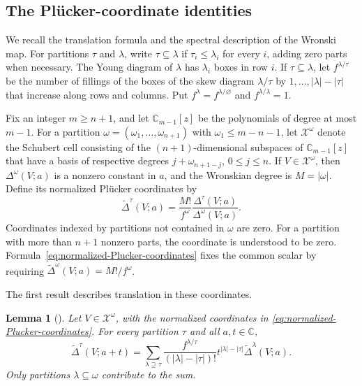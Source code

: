 \documentclass[11pt,letterpaper,reqno]{amsart}
\newtheorem{lem}[thm]{Lemma}
\theoremstyle{remark}
\numberwithin{equation}{section}
\newcommand{\C}{\mathbb C}
\begin{document}
\subsection{The Pl\"ucker-coordinate identities}

We recall the translation formula and the spectral description of the
Wronski map. For partitions $\tau$ and
$\lambda$, write $\tau\subseteq\lambda$ if $\tau_i\leq\lambda_i$ for every
$i$, adding zero parts when necessary. The Young diagram of $\lambda$ has
$\lambda_i$ boxes in row $i$. If $\tau\subseteq\lambda$, let
$f^{\lambda/\tau}$ be the number of fillings of the boxes of the skew diagram
$\lambda/\tau$ by $1,\ldots,|\lambda|-|\tau|$ that increase along rows and
columns. Put $f^\lambda=f^{\lambda/\varnothing}$ and
$f^{\lambda/\lambda}=1$.

Fix an integer $m\geq n+1$, and let $\C_{m-1}[z]$ be the polynomials of
degree at most $m-1$. For a partition
$\omega=(\omega_1,\ldots,\omega_{n+1})$ with
$\omega_1\leq m-n-1$, let $\mathcal X^\omega$ denote the Schubert cell
consisting of the $(n+1)$-dimensional subspaces of $\C_{m-1}[z]$ that have a
basis of respective degrees $j+\omega_{n+1-j}$, $0\leq j\leq n$.
If $V\in\mathcal X^\omega$, then $\Delta^\omega(V;a)$ is a nonzero
constant in $a$, and the Wronskian degree is $M=|\omega|$. Define its
normalized Pl\"ucker coordinates by
\begin{equation}\label{eq:normalized-Plucker-coordinates}
 \widetilde\Delta^\tau(V;a)
 =\frac{M!}{f^\omega}
   \frac{\Delta^\tau(V;a)}{\Delta^\omega(V;a)}.
\end{equation}
Coordinates indexed by partitions not contained in $\omega$ are zero.
For a partition with more than $n+1$ nonzero parts, the coordinate is
understood to be zero. Formula~\eqref{eq:normalized-Plucker-coordinates}
fixes the common scalar by requiring
$\widetilde\Delta^\omega(V;a)=M!/f^\omega$.

The first result describes translation in these coordinates.

\begin{lem}[{\cite[Proposition~2.9]{KP26}}]\label{lem:plucker-translation}
Let $V\in\mathcal X^\omega$, with the normalized coordinates in
\eqref{eq:normalized-Plucker-coordinates}. For every partition $\tau$ and
all $a,t\in\C$,
\begin{equation}\label{eq:Plucker-translation}
 \widetilde\Delta^\tau(V;a+t)
 =\sum_{\lambda\supseteq\tau}
   \frac{f^{\lambda/\tau}}{(|\lambda|-|\tau|)!}
   t^{|\lambda|-|\tau|}\widetilde\Delta^\lambda(V;a).
\end{equation}
Only partitions $\lambda\subseteq\omega$ contribute to the sum.
\end{lem}
\end{document}
